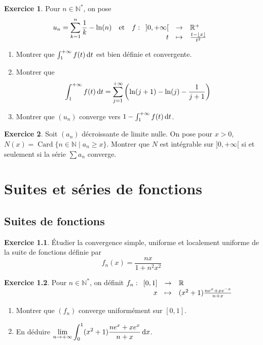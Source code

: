 \documentclass[12pt,a4paper]{book}
\renewcommand{\d}{{\, \rm d}}
\theoremstyle{definition}
\newtheorem{exo}{Exercice}[section]
\theoremstyle{remark}
\newcommand{\N}{\mathbb{N}}
\newcommand{\R}{\mathbb{R}}
\renewcommand{\d}{{\rm \, d}}
\DeclareMathOperator{\Card}{Card}
\newcommand{\applic}[4]{\begin{array}[t]{rcl}
#1 & \to & #2 \\
#3 & \mapsto & #4
\end{array}}
\begin{document}
\begin{exo}
    Pour $n\in \N^*$, on pose
    \[u_n = \sum_{k=1}^n \frac{1}{k} - \ln (n) \quad \text{et} \quad f : \applic{]0,+\infty[}{\R^+}{t}{\frac{t - \lfloor x \rfloor}{t^2}}\]

    \begin{enumerate}
        \item Montrer que $\int_1^{+\infty} f(t) \d t$ est bien définie et convergente.
        \item Montrer que
        \[\int_1^{+\infty} f(t) \d t = \sum_{j=1}^{+\infty} \left(\ln(j+1) - \ln(j) - \frac{1}{j+1}\right)\]
        \item Montrer que $(u_n)$ converge vers $1 - \int_1^{+\infty} f(t) \d t$.
    \end{enumerate}
\end{exo}

\begin{exo}
    Soit $(a_n)$ décroissante de limite nulle. On pose pour $x > 0$, $N(x) = \Card\{n \in \N \mid a_n \ge x\}$. Montrer que $N$ est intégrable sur $]0,+\infty[$ si et seulement si la série $\sum a_n$ converge.
\end{exo}

\chapter{Suites et séries de fonctions}

\section{Suites de fonctions}

\begin{exo}
    Étudier la convergence simple, uniforme et localement uniforme de la suite de fonctions définie par 
    \[f_n (x) = \frac{nx}{1+n^2 x^2}\]
\end{exo}

\begin{exo}
    Pour $n\in \N^*$, on définit $f_n : \applic{[0,1]}{\R}{x}{(x^2 + 1)\frac{ne^x + xe^{-x}}{n + x}}$
    \begin{enumerate}
        \item Montrer que $(f_n)$ converge uniformément sur $[0,1]$.
        \item En déduire $\displaystyle \lim_{n\to +\infty} \int_0^1 (x^2 + 1)\frac{ne^x + xe^x}{n+x} \d x$.
    \end{enumerate}
\end{exo}
\end{document}
